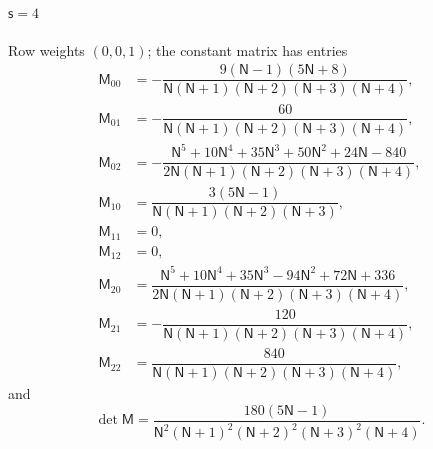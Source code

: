 \documentclass{amsart}
\theoremstyle{definition}
\theoremstyle{remark}
\numberwithin{equation}{section}
\begin{document}
\paragraph{$\mathsf s=4$} Row weights $(0,0,1)$; the constant matrix has entries
{\small\allowdisplaybreaks\begin{align*}
  \mathsf M_{00}&=-\dfrac{9(\mathsf N - 1)(5\mathsf N + 8)}{\mathsf N(\mathsf N + 1)(\mathsf N + 2)(\mathsf N + 3)(\mathsf N + 4)},\\
  \mathsf M_{01}&=-\dfrac{60}{\mathsf N(\mathsf N + 1)(\mathsf N + 2)(\mathsf N + 3)(\mathsf N + 4)},\\
  \mathsf M_{02}&=-\dfrac{\mathsf N^{5} + 10\mathsf N^{4} + 35\mathsf N^{3} + 50\mathsf N^{2} + 24\mathsf N - 840}{2\mathsf N(\mathsf N + 1)(\mathsf N + 2)(\mathsf N + 3)(\mathsf N + 4)},\\
  \mathsf M_{10}&=\dfrac{3(5\mathsf N - 1)}{\mathsf N(\mathsf N + 1)(\mathsf N + 2)(\mathsf N + 3)},\\
  \mathsf M_{11}&=0,\\
  \mathsf M_{12}&=0,\\
  \mathsf M_{20}&=\dfrac{\mathsf N^{5} + 10\mathsf N^{4} + 35\mathsf N^{3} - 94\mathsf N^{2} + 72\mathsf N + 336}{2\mathsf N(\mathsf N + 1)(\mathsf N + 2)(\mathsf N + 3)(\mathsf N + 4)},\\
  \mathsf M_{21}&=-\dfrac{120}{\mathsf N(\mathsf N + 1)(\mathsf N + 2)(\mathsf N + 3)(\mathsf N + 4)},\\
  \mathsf M_{22}&=\dfrac{840}{\mathsf N(\mathsf N + 1)(\mathsf N + 2)(\mathsf N + 3)(\mathsf N + 4)},
\end{align*}}
and
\[\det\mathsf M=\frac{180(5\mathsf N - 1)}{\mathsf N^{2}(\mathsf N + 1)^{2}(\mathsf N + 2)^{2}(\mathsf N + 3)^{2}(\mathsf N + 4)}.\]
\end{document}
